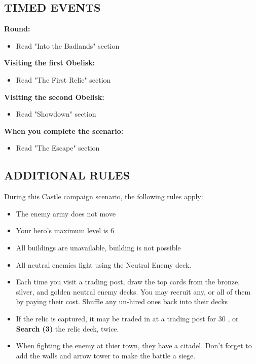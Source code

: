 \begin{multicols}{2}

\subsection*{\MakeUppercase{Timed Events}}

\textbf{ Round:}
\begin{itemize}
  \item Read "Into the Badlands" section
\end{itemize}

\textbf{Visiting the first Obelisk:}
\begin{itemize}
  \item Read "The First Relic" section
\end{itemize}

\textbf{Visiting the second Obelisk:}
\begin{itemize}
  \item Read "Showdown" section
\end{itemize}

\textbf{When you complete the scenario:}
\begin{itemize}
  \item Read "The Escape" section
\end{itemize}



\subsection*{\MakeUppercase{Additional rules}}

During this Castle campaign scenario, the following rules apply:

\begin{itemize}
  \item The enemy army does not move
  \item Your hero's maximum level is 6
  \item All buildings are unavailable, building is not possible
\end{itemize}

\columnbreak

\begin{itemize}
\item All neutral enemies fight using the Neutral Enemy deck.
\item Each time you visit a trading post, draw the top cards from the  bronze,  silver, and  golden neutral enemy decks. You may recruit any, or all of them by paying their cost. Shuffle any un-hired ones back into their decks
\item If the relic is captured, it may be traded in at a trading post for 30 , or \textbf{Search (3)} the relic deck, twice.
\item When fighting the enemy at thier town, they have a citadel. Don't forget to add the walls and arrow tower to make the battle a siege.
\end{itemize}

\end{multicols}

